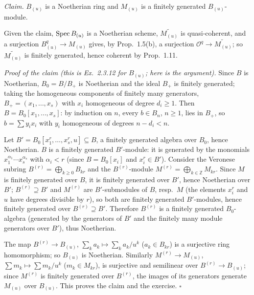 \documentclass[11pt]{article}
\begin{document}
\emph{Claim.} $B_{(u)}$ is a Noetherian ring and $M_{(u)}$ is a finitely generated $B_{(u)}$-module.

Given the claim, $\operatorname{Spec} B_{(u)}$ is a Noetherian scheme, $\widetilde{M_{(u)}}$ is quasi-coherent, and a surjection $B_{(u)}^q\to M_{(u)}$ gives, by Prop.~1.5(b), a surjection $\mathcal O^q\to\widetilde{M_{(u)}}$; so $\widetilde{M_{(u)}}$ is finitely generated, hence coherent by Prop.~1.11.

\emph{Proof of the claim (this is Ex.~2.3.12 for $B_{(u)}$; here is the argument).} Since $B$ is Noetherian, $B_0=B/B_+$ is Noetherian and the ideal $B_+$ is finitely generated; taking the homogeneous components of finitely many generators, $B_+=(x_1,\dots,x_s)$ with $x_i$ homogeneous of degree $d_i\ge1$. Then $B=B_0[x_1,\dots,x_s]$: by induction on $n$, every $b\in B_n$, $n\ge1$, lies in $B_+$, so $b=\sum y_ix_i$ with $y_i$ homogeneous of degrees $n-d_i<n$.

Let $B'=B_0[x_1^r,\dots,x_s^r,u]\subseteq B$, a finitely generated algebra over $B_0$, hence Noetherian. $B$ is a finitely generated $B'$-module: it is generated by the monomials $x_1^{\alpha_1}\cdots x_s^{\alpha_s}$ with $\alpha_i<r$ (since $B=B_0[x_i]$ and $x_i^r\in B'$). Consider the Veronese subring $B^{(r)}=\bigoplus_{k\ge0}B_{kr}$ and the $B^{(r)}$-module $M^{(r)}=\bigoplus_{k\in\mathbb Z}M_{kr}$. Since $M$ is finitely generated over $B$, it is finitely generated over $B'$, hence Noetherian over $B'$; $B^{(r)}\supseteq B'$ and $M^{(r)}$ are $B'$-submodules of $B$, resp.\ $M$ (the elements $x_i^r$ and $u$ have degrees divisible by $r$), so both are finitely generated $B'$-modules, hence finitely generated over $B^{(r)}\supseteq B'$. Therefore $B^{(r)}$ is a finitely generated $B_0$-algebra (generated by the generators of $B'$ and the finitely many module generators over $B'$), thus Noetherian.

The map $B^{(r)}\to B_{(u)}$, $\sum_ka_k\mapsto\sum_ka_k/u^k$ ($a_k\in B_{kr}$) is a surjective ring homomorphism; so $B_{(u)}$ is Noetherian. Similarly $M^{(r)}\to M_{(u)}$, $\sum m_k\mapsto\sum m_k/u^k$ ($m_k\in M_{kr}$), is surjective and semilinear over $B^{(r)}\to B_{(u)}$; since $M^{(r)}$ is finitely generated over $B^{(r)}$, the images of its generators generate $M_{(u)}$ over $B_{(u)}$. This proves the claim and the exercise. \hfill$\square$
\end{document}
